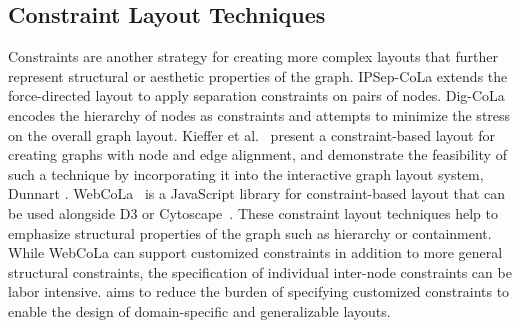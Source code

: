 \subsection{Constraint Layout Techniques}
Constraints are another strategy for creating more complex layouts that further
represent structural or aesthetic properties of the graph. IPSep-CoLa extends
the force-directed layout to apply separation constraints on pairs of nodes.
Dig-CoLa \cite{dwyer2005dig} encodes the hierarchy of nodes as constraints
and attempts to minimize the stress on the overall graph layout. 
Kieffer et al.~\cite{kieffer2013incremental} present a constraint-based 
layout for creating graphs with node and edge alignment,
and demonstrate the feasibility of such a technique by incorporating it into
the interactive graph layout system, Dunnart \cite{dwyer2008dunnart}.
WebCoLa~\cite{WebCoLa} is a JavaScript library for constraint-based layout 
that can be used alongside D3 or Cytoscape~\cite{shannon2003cytoscape}. 
These constraint layout techniques help to emphasize structural properties of
the graph such as hierarchy or containment. While WebCoLa can support 
customized constraints in addition to more general structural constraints,
the specification of individual inter-node constraints can be labor intensive.
\projectname aims to reduce the burden of specifying customized constraints
to enable the design of domain-specific and generalizable layouts.


